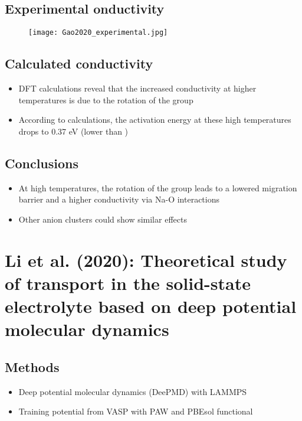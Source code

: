 \documentclass[10pt,a4paper, titlepage]{article}
\begin{document}
\subsection{Experimental onductivity}

\begin{figure}[H]
\centering
\texttt{[image: Gao2020\_experimental.jpg]}
\end{figure}

\subsection{Calculated conductivity}

\begin{itemize}
 \item DFT calculations reveal that the increased conductivity at higher temperatures is due to the rotation of the  group
 \item According to calculations, the activation energy at these high temperatures drops to 0.37 eV (lower than )
\end{itemize}

\subsection{Conclusions}

\begin{itemize}
  \item At high temperatures, the rotation of the  group leads to a lowered migration barrier and a higher conductivity via Na-O interactions
  \item Other anion clusters could show similar effects
\end{itemize}

\section{Li et al. (2020): Theoretical study of  transport in the solid-state electrolyte  based on deep potential molecular dynamics}

\subsection{Methods}

\begin{itemize}
  \item Deep potential molecular dynamics (DeePMD) with LAMMPS
  \item Training potential from VASP with PAW and PBEsol functional
\end{itemize}
\end{document}
